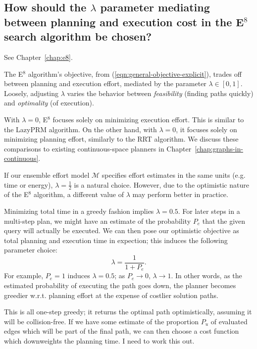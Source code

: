 {
\renewcommand\thesubsection{Q\arabic{subsection}}

\subsection{How should the $\lambda$ parameter mediating
   between planning and execution cost in the E$^8$
   search algorithm be chosen?}
\label{ques:choosing-lambda}

See Chapter~\ref{chap:e8}.

The E$^8$ algorithm's objective,
from (\ref{eqn:general-objective-explicit}),
trades off between planning and execution effort,
mediated by the parameter $\lambda \in [0,1]$.
Loosely,
adjusting $\lambda$ varies the behavior between
\emph{feasibility} (finding paths quickly)
and \emph{optimality} (of execution).

With $\lambda=0$,
E$^8$ focuses solely on minimizing execution effort.
This is similar to the LazyPRM algorithm.
On the other hand,
with $\lambda=0$,
it focuses solely on minimizing planning effort,
similarly to the RRT algorithm.
We discuss these comparisons to existing continuous-space planners
in Chapter~\ref{chap:graphs-in-continuous}.

If our ensemble effort model $\mathcal{M}$
specifies effort estimates in the same units
(e.g. time or energy),
$\lambda=\frac{1}{2}$ is a natural choice.
However,
due to the optimistic nature of the E$^8$ algorithm,
a different value of $\lambda$ may perform better in practice.

Minimizing total time in a greedy fashion implies $\lambda = 0.5$.
For later steps in a multi-step plan,
we might have an estimate of the probability $P_e$ that the given query will
actually be executed.
We can then pose our optimistic objective as total planning and execution
time in expection;
this induces the following parameter choice:
\begin{equation}
   \lambda = \frac{1}{1 + P_e} .
\end{equation}
For example, $P_e=1$ induces $\lambda = 0.5$;
as $P_e \rightarrow 0$, $\lambda \rightarrow 1$.
In other words,
as the estimated probability of executing the path goes down,
the planner becomes greedier w.r.t. planning effort at the expense of
costlier solution paths.

This is all one-step greedy;
it returns the optimal path optimistically,
assuming it will be collision-free.
If we have some estimate of the proportion $P_u$ of evaluated edges
which will be part of the final path,
we can then choose a cost function which downweights the planning time.
I need to work this out.

}
